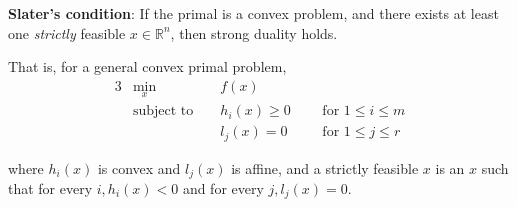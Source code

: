 \documentclass[11pt]{article}
\newcommand{\R}{\mathbb{R}}
\begin{document}
\textbf{Slater's condition}: If the primal is a convex problem, and there exists
at least one \textit{strictly} feasible $x \in \R^n$, then strong duality holds.

That is, for a general convex primal problem,
\begin{alignat*}{3}
&\min_x &&f(x) \\
&\text{subject to } && h_i(x) \geq 0 ~~~&&\text{for } 1 \leq i \leq m \\
&&& l_j(x) = 0 ~~~&&\text{for } 1 \leq j \leq r
\end{alignat*}

where $h_i(x)$ is convex and $l_j(x)$ is affine, and a strictly feasible $x$ is
an $x$ such that for every $i, h_i(x) < 0$ and for every
$j, l_j(x) = 0$.
\end{document}
